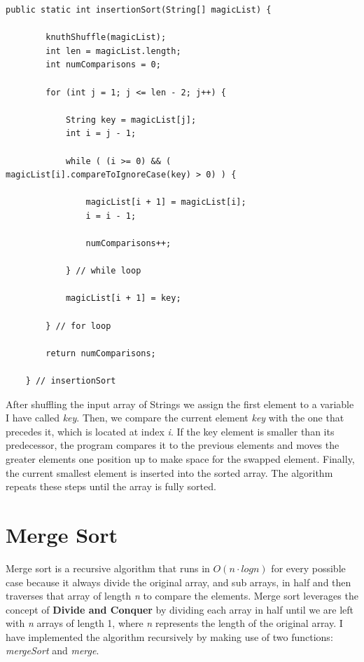 \documentclass[letterpaper, 10pt]{article}
\begin{document}
\begin{lstlisting}
public static int insertionSort(String[] magicList) {
		
		knuthShuffle(magicList);
		int len = magicList.length;
		int numComparisons = 0;
		
		for (int j = 1; j <= len - 2; j++) {
			
			String key = magicList[j];
			int i = j - 1;
			
			while ( (i >= 0) && ( magicList[i].compareToIgnoreCase(key) > 0) ) {
				
				magicList[i + 1] = magicList[i];
				i = i - 1;
				
				numComparisons++;
				
			} // while loop
			
			magicList[i + 1] = key;
			
		} // for loop
		
		return numComparisons;
		
	} // insertionSort
\end{lstlisting}

After shuffling the input array of Strings we assign the first element to a variable I have called \textit{key}. Then, we compare the current element \textit{key} with the one that precedes it, which is located at index \textit{i}. If the key element is smaller than its predecessor, the program compares it to the previous elements and moves the greater elements one position up to make space for the swapped element. Finally, the current smallest element is inserted into the sorted array. The algorithm repeats these steps until the array is fully sorted.

\pagebreak
\section{Merge Sort}
Merge sort is a recursive algorithm that runs in $O(n\cdot log n)$ for every possible case because it always divide the original array, and sub arrays, in half and then traverses that array of length \textit{n} to compare the elements. Merge sort leverages the concept of \textbf{Divide and Conquer} by dividing each array in half until we are left with \textit{n} arrays of length 1, where \textit{n} represents the length of the original array. I have implemented the algorithm recursively by making use of two functions: \textit{mergeSort} and \textit{merge}.
\end{document}
